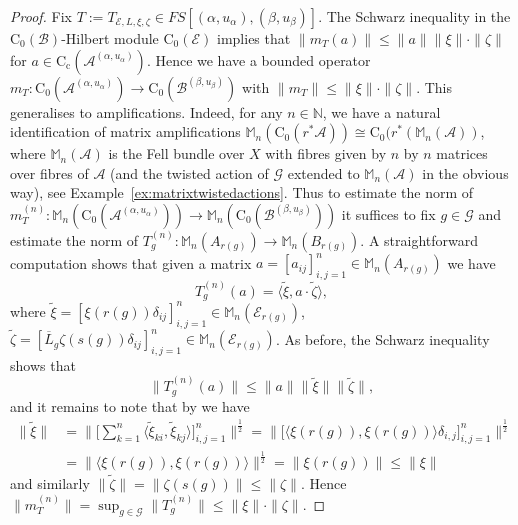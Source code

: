 \documentclass[11 pt, leqno]{amsart}
\numberwithin{equation}{section}
\theoremstyle{plain}
\theoremstyle{definition}
\newcommand{\Mat}{\mathbb M} %
\newcommand*{\contc}{\mathrm{C_c}}%
\newcommand*{\contz}{\mathrm{C_0}}%
\newcommand{\B}{\mathcal B}
\newcommand{\LL}{\mathcal L}
\newcommand{\m}{m}
\newcommand{\G}{\mathcal G} %
\newcommand{\EE}{\mathcal E}
\newcommand{\A}{\mathcal A}
\newcommand{\N}{\mathbb N}
\begin{document}
\begin{proof} 
Fix $T:=T_{\EE,L,\xi,\zeta} \in FS[(\alpha,u_{\alpha}),(\beta,u_{\beta})]$.
The Schwarz inequality in the $\contz(\B)$-Hilbert module $\contz(\EE)$ implies that $\|\m_T(a)\|\leq \|a\| \|\xi\| \cdot \|\zeta\|$ for $a\in \contc(\A^{(\alpha,u_{\alpha})})$. 
Hence we have a bounded operator $\m_{T}: \contz(\A^{(\alpha,u_{\alpha})})\to \contz(\B^{(\beta,u_{\beta})})$ with $\|\m_{T}\|\leq \|\xi\| \cdot \|\zeta\|$. 
This generalises to amplifications.
Indeed, for any $n \in \N$, we have a natural identification of matrix amplifications $\Mat_n(\contz(r^*\A))\cong \contz(r^*(\Mat_n(\A))$, where $\Mat_n(\A)$ is the Fell bundle over $X$ with fibres given by $n$ by $n$ matrices over fibres of $\A$ (and the twisted action of $\G$ extended to $\Mat_n(\A)$ in the obvious way), see Example~\ref{ex:matrixtwistedactions}.
Thus to estimate the norm of $m_T^{(n)}: \Mat_n(\contz(\A^{(\alpha,u_{\alpha})})) \to \Mat_n(\contz(\B^{(\beta,u_{\beta})}))$ it suffices to fix $g \in \G$ and estimate the norm of $T_g^{(n)}: \Mat_n(A_{r(g)}) \to \Mat_n (B_{r(g)})$. 
A straightforward computation shows that given a matrix $a=[a_{ij}]_{i,j=1}^n \in \Mat_n (A_{r(g)})$ we have 
\[ 
    T_g^{(n)}(a) = \langle \tilde{\xi} , a \cdot \tilde{\zeta} \rangle,
\]
where $\tilde{\xi}= [\xi(r(g)) \delta_{ij}]_{i,j=1}^n \in \Mat_n (\EE_{r(g)})$, $\tilde{\zeta}= [\overline{L}_g \zeta(s(g)) \delta_{ij}]_{i,j=1}^n \in \Mat_n (\EE_{r(g)})$.
As before, the Schwarz inequality shows that 
\[
    \|T_g^{(n)}(a)\| \leq \|a\| \|\tilde{\xi}\| \|\tilde{\zeta}\|,
\]
and it remains to note that by \cite[Section 3, Formula (1')]{Ble} we have 
\begin{align*}
    \|\tilde{\xi}\| &= \Big\| \Big[\sum_{k=1}^n \langle \tilde{\xi}_{ki}, \tilde{\xi}_{kj}\rangle\Big]_{i,j=1}^n \Big\|^{\frac{1}{2}} = \Big\| \big[ \langle \xi(r(g)), \xi(r(g)) \rangle \delta_{i,j} \big]_{i,j=1}^n \Big\|^{\frac{1}{2}} \\
		&= \|\langle \xi(r(g)), \xi(r(g)) \rangle \|^{\frac{1}{2}} 
		= \|\xi(r(g))\|\leq \|\xi\|
\end{align*}
and similarly $\|\tilde{\zeta}\| =  \|\zeta(s(g))\|\leq \|\zeta\|$. 
Hence $\| \m_{T}^{(n)} \|=\sup_{g\in \G} \|T_g^{(n)}\|\leq \|\xi\| \cdot \|\zeta\|$.
\end{proof}
\end{document}
